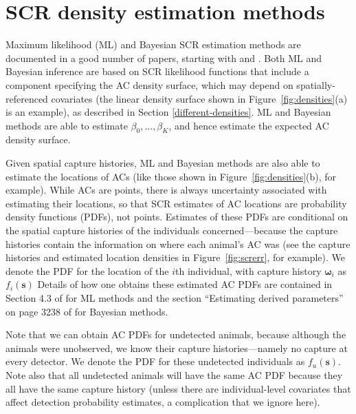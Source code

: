 \documentclass[useAMS,usenatbib,referee]{biom}
\begin{document}
\section{SCR density estimation methods} \label{secrmethods}

Maximum likelihood (ML) and Bayesian SCR estimation methods are documented in a good number of papers, starting with \cite{Borchers+Efford:08} and \cite{Royle+Young:08}. Both ML and Bayesian inference are based on SCR likelihood functions that include a component specifying the AC density surface, which may depend on spatially-referenced covariates (the linear density surface shown in Figure~\ref{fig:densities}(a) is an example), as described in Section \ref{different-densities}. ML and Bayesian methods are able to estimate $\beta_0,\ldots,\beta_K$, and hence estimate the expected AC density surface. 

Given spatial capture histories, ML and Bayesian methods are also able to estimate the locations of ACs (like those shown in Figure~\ref{fig:densities}(b), for example). While ACs are points, there is always uncertainty associated with estimating their locations, so that SCR estimates of AC locations are probability density functions (PDFs), not points. Estimates of these PDFs are conditional on the spatial capture histories of the individuals concerned---because the capture histories contain the information on where each animal's AC was (see the capture histories and estimated location densities in Figure~\ref{fig:screrr}, for example). We denote the PDF for the location of the $i$th individual, with capture history $\bm{\omega}_i$ as $f_i(\bm{s})$ Details of how one obtains these estimated AC PDFs are contained in Section 4.3 of \cite{Borchers+Efford:08} for ML methods and the section ``Estimating derived parameters'' on page 3238 of \cite{Royle+al:09b} for Bayesian methods.

Note that we can obtain AC PDFs for undetected animals, because although the animals were unobserved, we know their capture histories---namely no capture at every detector. We denote the PDF for these undetected individuals as $f_u(\bm{s})$. Note also that all undetected animals will have the same AC PDF because they all have the same capture history (unless there are individual-level covariates that affect detection probability estimates, a complication that we ignore here). 
\end{document}
